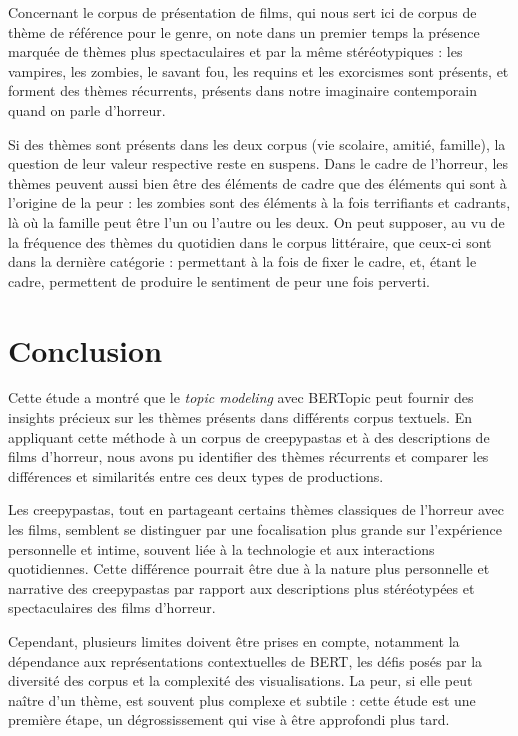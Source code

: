 \documentclass[a4paper,12pt,onecolumn,oneside]{article}
\begin{document}
Concernant le corpus de présentation de films, qui nous sert ici de corpus de thème de référence pour le genre, on note dans un premier temps la présence marquée de thèmes plus spectaculaires et par la même stéréotypiques : les vampires, les zombies, le savant fou, les requins et les exorcismes sont présents, et forment des thèmes récurrents, présents dans notre imaginaire contemporain quand on parle d'horreur.

Si des thèmes sont présents dans les deux corpus (vie scolaire, amitié, famille), la question de leur valeur respective reste en suspens. Dans le cadre de l'horreur, les thèmes peuvent aussi bien être des éléments de cadre que des éléments qui sont à l'origine de la peur : les zombies sont des éléments à la fois terrifiants et cadrants, là où la famille peut être l'un ou l'autre ou les deux. On peut supposer, au vu de la fréquence des thèmes du quotidien dans le corpus littéraire, que ceux-ci sont dans la dernière catégorie : permettant à la fois de fixer le cadre, et, étant le cadre, permettent de produire le sentiment de peur une fois perverti.

\section{Conclusion}
Cette étude a montré que le \emph{topic modeling} avec BERTopic peut fournir des insights précieux sur les thèmes présents dans différents corpus textuels. En appliquant cette méthode à un corpus de creepypastas et à des descriptions de films d'horreur, nous avons pu identifier des thèmes récurrents et comparer les différences et similarités entre ces deux types de productions.

Les creepypastas, tout en partageant certains thèmes classiques de l'horreur avec les films, semblent se distinguer par une focalisation plus grande sur l'expérience personnelle et intime, souvent liée à la technologie et aux interactions quotidiennes. Cette différence pourrait être due à la nature plus personnelle et narrative des creepypastas par rapport aux descriptions plus stéréotypées et spectaculaires des films d'horreur.

Cependant, plusieurs limites doivent être prises en compte, notamment la dépendance aux représentations contextuelles de BERT, les défis posés par la diversité des corpus et la complexité des visualisations. La peur, si elle peut naître d'un thème, est souvent plus complexe et subtile : cette étude est une première étape, un dégrossissement qui vise à être approfondi plus tard.
\end{document}
